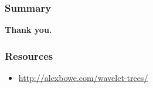 \documentclass{beamer}
\begin{document}
% 
% 
% 
% 
% 


\begin{frame}
\frametitle{Summary}
\begin{center}
\large \bf Thank you.
\end{center}
\end{frame}
 
\begin{frame}
\frametitle{Resources}
\begin{itemize}
  \item \url{http://alexbowe.com/wavelet-trees/}
\end{itemize}
\end{frame}
 
\end{document}
